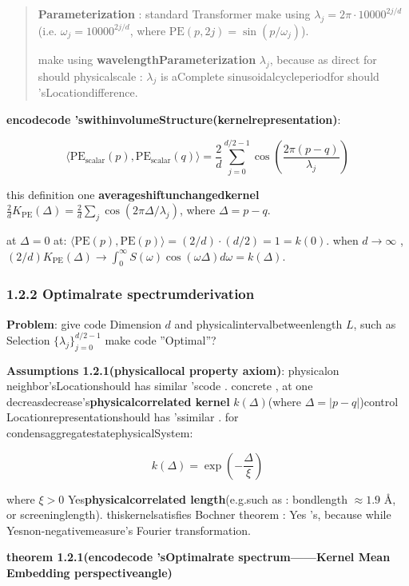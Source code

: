 \documentclass[
  12pt,
]{article}
\begin{document}
\begin{quote}
\textbf{Parameterization }: standard  Transformer make using 
\(\lambda_j = 2\pi \cdot 10000^{2j/d}\)(i.e.
\(\omega_j = 10000^{2j/d}\), where
\(\text{PE}(p, 2j) = \sin(p/\omega_j)\)). 

make using \textbf{wavelengthParameterization }
\(\lambda_j\), because as direct for should physicalscale : \(\lambda_j\)
is aComplete sinusoidalcycleperiodfor should 'sLocationdifference. 
\end{quote}

\textbf{encodecode 'swithinvolumeStructure(kernelrepresentation)}: 

\[\langle \text{PE}_{\text{scalar}}(p), \text{PE}_{\text{scalar}}(q) \rangle = \frac{2}{d}\sum_{j=0}^{d/2-1} \cos\left(\frac{2\pi(p-q)}{\lambda_j}\right)\]

this definition one \textbf{averageshiftunchangedkernel}
\(\frac{2}{d}K_{\text{PE}}(\Delta) = \frac{2}{d}\sum_j \cos(2\pi\Delta/\lambda_j)\), where
\(\Delta = p - q\). 

at  \(\Delta = 0\)
at: \(\langle \text{PE}(p), \text{PE}(p) \rangle = (2/d) \cdot (d/2) = 1 = k(0)\). when 
\(d \to \infty\)
, \((2/d)K_{\text{PE}}(\Delta) \to \int_0^\infty S(\omega)\cos(\omega\Delta)d\omega = k(\Delta)\). 

\subsubsection{1.2.2
Optimalrate spectrumderivation}\label{ux6700ux4f18ux9891ux7387ux8c31ux63a8ux5bfc}

\textbf{Problem}: give code Dimension \(d\) and physicalintervalbetweenlength \(L\), such as Selection
\(\{\lambda_j\}_{j=0}^{d/2-1}\) make code ''Optimal''?

\textbf{Assumptions
1.2.1(physicallocal property axiom)}: physicalon neighbor'sLocationshould has similar 'scode . concrete , at one decreasdecrease's\textbf{physicalcorrelated kernel}
\(k(\Delta)\)(where
\(\Delta = |p-q|\))control Locationrepresentationshould has 'ssimilar . for condensaggregatestatephysicalSystem: 

\[k(\Delta) = \exp\left(-\frac{\Delta}{\xi}\right)\]

where \(\xi > 0\) Yes\textbf{physicalcorrelated length}(e.g.such as : bondlength \(\approx 1.9\)
Å, or screeninglength). thiskernelsatisfies  Bochner theorem : Yes 's, because while Yesnon-negativemeasure's
Fourier transformation. 

\textbf{theorem  1.2.1(encodecode 'sOptimalrate spectrum------Kernel Mean Embedding perspectiveangle)}
\end{document}
